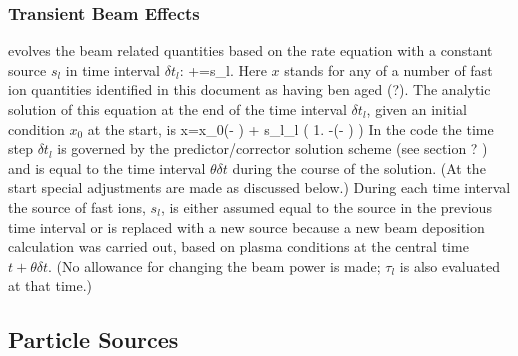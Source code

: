 \subsubsection{Transient Beam Effects}\label{tbeam}

\ot evolves the beam related quantities based on the rate equation with a
constant source $s_l$ in time interval $\delta t_l$:
\beq
  +=s_l.
\eeq
Here $x$ stands for any of a number of fast ion quantities identified in this
document as having ben aged (?). The analytic solution of this equation at the
end of the time interval $\delta t_l$, given an initial condition $x_0$ at the
start, is
\beq
 x=x_0\exp \left (- \right ) +
 s_l\tau_l \left ( 1. -\exp \left (-
 \right ) \right )
\eeq
In the code the time step $\delta t_l $ is governed by the
predictor/corrector solution scheme (see section ? ) and is
equal to the time interval $\theta \delta t $ during the course
of the solution. (At the start special adjustments are made as
discussed below.) During each time interval the source of fast ions, $s_l$, is either assumed equal to the source in the previous
time interval
or is replaced with a new source because a new beam deposition
calculation was carried out, based on plasma conditions at the
central time $t+\theta \delta t $. (No allowance for changing the
beam power is made; $ \tau_l$ is also evaluated at that time.)

\subsection{Particle Sources}

